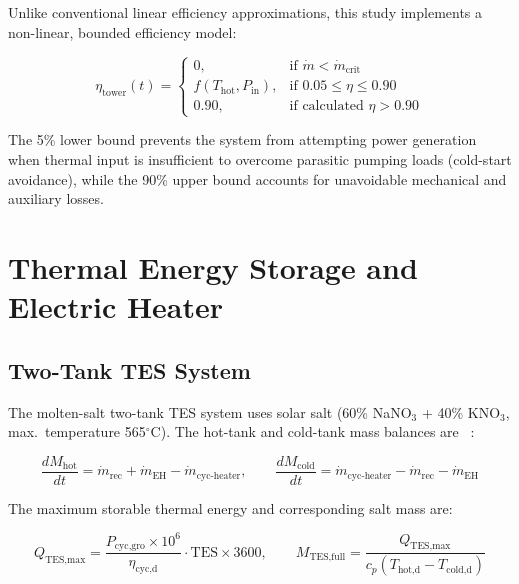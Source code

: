 \documentclass[journal]{IEEEtran}
\begin{document}
Unlike conventional linear efficiency approximations, this study implements a non-linear, bounded efficiency model:

\begin{equation}
\eta_{\text{tower}}(t) = \begin{cases}
0, & \text{if } \dot{m} < \dot{m}_{\text{crit}} \\
f(T_{\text{hot}}, P_{\text{in}}), & \text{if } 0.05 \leq \eta \leq 0.90 \\
0.90, & \text{if calculated } \eta > 0.90
\end{cases}
\label{eq:eta_sco2}
\end{equation}

The 5\% lower bound prevents the system from attempting power generation when thermal input is insufficient to overcome parasitic pumping loads (cold-start avoidance), while the 90\% upper bound accounts for unavoidable mechanical and auxiliary losses.

\section{Thermal Energy Storage and Electric Heater}
\label{sec:tes}

\subsection{Two-Tank TES System}

The molten-salt two-tank TES system uses solar salt (60\% NaNO$_3$ + 40\% KNO$_3$, max.\ temperature 565$^\circ$C). The hot-tank and cold-tank mass balances are ~\cite{liu2022}:

\begin{equation}
\frac{dM_{\text{hot}}}{dt} = \dot{m}_{\text{rec}} + \dot{m}_{\text{EH}} - \dot{m}_{\text{cyc-heater}}, \qquad \frac{dM_{\text{cold}}}{dt} = \dot{m}_{\text{cyc-heater}} - \dot{m}_{\text{rec}} - \dot{m}_{\text{EH}}
\label{eq:tes_mass}
\end{equation}

The maximum storable thermal energy and corresponding salt mass are:

\begin{equation}
Q_{\text{TES,max}} = \frac{P_{\text{cyc,gro}} \times 10^6}{\eta_{\text{cyc,d}}} \cdot \text{TES} \times 3600, \qquad M_{\text{TES,full}} = \frac{Q_{\text{TES,max}}}{c_p (T_{\text{hot,d}} - T_{\text{cold,d}})}
\label{eq:tes_energy}
\end{equation}
\end{document}
